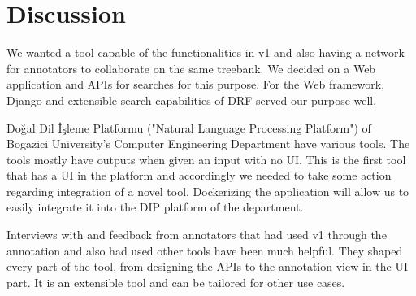 \section{Discussion}
\label{sec:discussion}

We wanted a tool capable of the functionalities in \boat{} v1 and also having a network for annotators to collaborate on the same treebank.
We decided on a Web application and APIs for searches for this purpose.
For the Web framework, Django and extensible search capabilities of DRF served our purpose well.

Doğal Dil İşleme Platformu ("Natural Language Processing Platform") of Bogazici University's Computer Engineering Department have various tools.
The tools mostly have outputs when given an input with no UI.
This is the first tool that has a UI in the platform and accordingly we needed to take some action regarding integration of a novel tool.
Dockerizing the application will allow us to easily integrate it into the DIP platform of the department.\cite{DIP}

Interviews with and feedback from annotators that had used \boat{} v1 through the \bountreebank{} annotation and also had used other tools have been much helpful.
They shaped every part of the tool, from designing the APIs to the annotation view in the UI part.
It is an extensible tool and can be tailored for other use cases.
